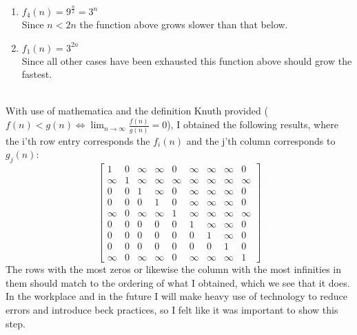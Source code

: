 \documentclass[12pt]{article}
\begin{document}
\begin{enumerate}
\item \begin{math}f_4(n) = 9^{\frac{n}{2}} = 3^{n}\end{math}\\
Since \begin{math}n < 2n\end{math} the function above grows slower than that below.
\item \begin{math}f_1(n) = 3^{2n}\end{math}\\
Since all other cases have been exhausted this function above should grow the fastest.\\\\
\end{enumerate}
With use of mathematica and the definition Knuth provided (\begin{math}f(n) < g(n) \Longleftrightarrow \lim_{n\to\infty} \frac{f(n)}{g(n)} = 0\end{math}), I obtained the following results, where the i'th row entry corresponds the \begin{math}f_i(n)\end{math} and  the j'th column corresponds to \begin{math}g_j(n)\end{math}:\\
\[
    \begin{bmatrix}
        1 & 0 & \infty & \infty & 0 & \infty & \infty & \infty & 0\\
        \infty & 1 & \infty & \infty & \infty & \infty & \infty & \infty & \infty\\
        0 & 0 & 1 & \infty & 0 & \infty & \infty & \infty & 0\\
        0 & 0 & 0 & 1 & 0 & \infty & \infty & \infty & 0\\
        \infty & 0 & \infty & \infty & 1 & \infty & \infty & \infty & \infty\\
        0 & 0 & 0 & 0 & 0 & 1 & \infty & \infty & 0\\
        0 & 0 & 0 & 0 & 0 & 0 & 1 & \infty & 0\\
        0 & 0 & 0 & 0 & 0 & 0 & 0 & 1 & 0\\
        \infty & 0 & \infty & \infty & 0 & \infty & \infty & \infty & 1
    \end{bmatrix}
\]
The rows with the most zeros or likewise the column with the most infinities in them should match to the ordering of what I obtained, which we see that it does. In the workplace and in the future I will make heavy use of technology to reduce errors and introduce beck practices, so I felt like it was important to show this step.
\end{document}
